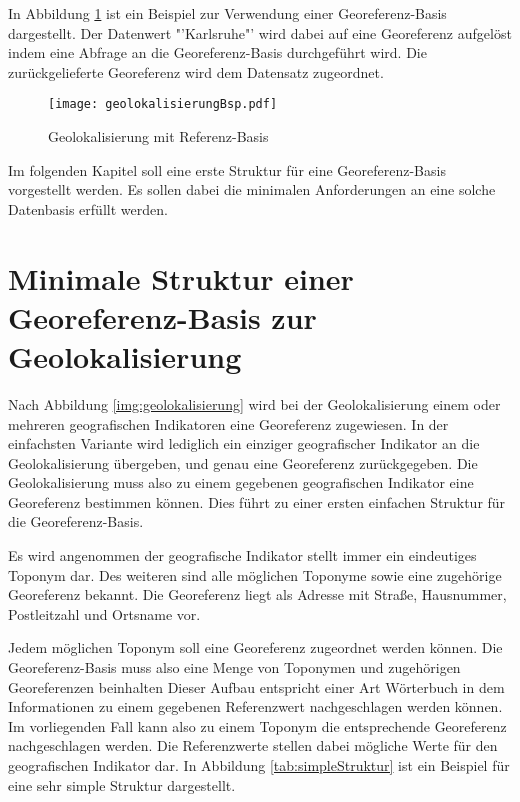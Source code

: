 		In Abbildung \ref{img:geolokalisierungBsp} ist ein Beispiel zur Verwendung einer Georeferenz-Basis dargestellt.
		Der Datenwert "'Karlsruhe"' wird dabei auf eine Georeferenz aufgelöst indem eine Abfrage an die Georeferenz-Basis durchgeführt wird.
		Die zurückgelieferte Georeferenz wird dem Datensatz zugeordnet.

		\begin{figure}[!ht]
		\begin{center}
		\texttt{[image: geolokalisierungBsp.pdf]}
		\caption{Geolokalisierung mit Referenz-Basis}
		\label{img:geolokalisierungBsp}
		\end{center}
		\end{figure}	

		Im folgenden Kapitel soll eine erste Struktur für eine Georeferenz-Basis vorgestellt werden.
		Es sollen dabei die minimalen Anforderungen an eine solche Datenbasis erfüllt werden.

	\section{Minimale Struktur einer Georeferenz-Basis zur Geolokalisierung} \label{sec:generelleStruktur} 
		
		Nach Abbildung \ref{img:geolokalisierung} wird bei der Geolokalisierung einem oder mehreren geografischen Indikatoren eine Georeferenz zugewiesen.
		In der einfachsten Variante wird lediglich ein einziger geografischer Indikator an die Geolokalisierung übergeben, und genau eine Georeferenz zurückgegeben.
		Die Geolokalisierung muss also zu einem gegebenen geografischen Indikator eine Georeferenz bestimmen können.
		Dies führt zu einer ersten einfachen Struktur für die Georeferenz-Basis.	

		Es wird angenommen der geografische Indikator stellt immer ein eindeutiges Toponym dar.
		Des weiteren sind alle möglichen Toponyme sowie eine zugehörige Georeferenz bekannt. 
		Die Georeferenz liegt als Adresse mit Straße, Hausnummer, Postleitzahl und Ortsname vor.

		Jedem möglichen Toponym soll eine Georeferenz zugeordnet werden können. 
		Die Georeferenz-Basis muss also eine Menge von Toponymen und zugehörigen Georeferenzen beinhalten
		Dieser Aufbau entspricht einer Art Wörterbuch in dem Informationen zu einem gegebenen Referenzwert nachgeschlagen werden können.
		Im vorliegenden Fall kann also zu einem Toponym die entsprechende Georeferenz nachgeschlagen werden.
		Die Referenzwerte stellen dabei mögliche Werte für den geografischen Indikator dar. 
		In Abbildung \ref{tab:simpleStruktur} ist ein Beispiel für eine sehr simple Struktur dargestellt.

